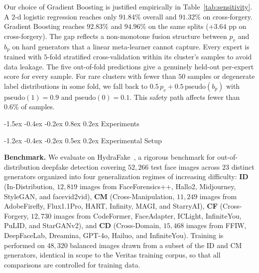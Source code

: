 \documentclass[10pt,twocolumn,letterpaper]{article}
\makeatletter
\renewcommand\section{\@startsection{section}{1}{\z@}%
  {-1.5ex \@plus -0.4ex \@minus -0.2ex}%
  {0.8ex \@plus 0.2ex}%
  {\normalfont\large\bfseries}}
\renewcommand\subsection{\@startsection{subsection}{2}{\z@}%
  {-1.2ex \@plus -0.4ex \@minus -0.2ex}%
  {0.5ex \@plus 0.2ex}%
  {\normalfont\normalsize\bfseries}}
\makeatother
\begin{document}
\par Our choice of Gradient Boosting is justified empirically in Table~\ref{tab:sensitivity}. A 2-d logistic regression reaches only $91.84\%$ overall and $91.32\%$ on cross-forgery. Gradient Boosting reaches $92.83\%$ and $94.96\%$ on the same splits ($+3.64$ pp on cross-forgery). The gap reflects a non-monotone fusion structure between $p_v$ and $b_p$ on hard generators that a linear meta-learner cannot capture. Every expert is trained with $5$-fold stratified cross-validation within its cluster's samples to avoid data leakage. The five out-of-fold predictions give a genuinely held-out per-expert score for every sample. For rare clusters with fewer than $50$ samples or degenerate label distributions in some fold, we fall back to $0.5\,p_v + 0.5\,\mathrm{pseudo}(b_p)$ with $\mathrm{pseudo}(1){=}0.9$ and $\mathrm{pseudo}(0){=}0.1$. This safety path affects fewer than $0.6\%$ of samples.

\section{Experiments}
\label{sec:experiments}

\subsection{Experimental Setup}
\label{sec:setup}

\textbf{Benchmark.}
We evaluate on HydraFake~\cite{veritas}, a rigorous benchmark for out-of-distribution deepfake detection covering $52{,}266$ test face images across $23$ distinct generators organized into four generalization regimes of increasing difficulty: \textbf{ID} (In-Distribution, $12{,}819$ images from FaceForensics++, Hallo2, Midjourney, StyleGAN, and facevid2vid), \textbf{CM} (Cross-Manipulation, $11{,}249$ images from AdobeFirefly, Flux1.1Pro, HART, Infinity, MAGI, and StarryAI), \textbf{CF} (Cross-Forgery, $12{,}730$ images from CodeFormer, FaceAdapter, ICLight, InfiniteYou, PuLID, and StarGANv2), and \textbf{CD} (Cross-Domain, $15{,}468$ images from FFIW, DeepFaceLab, Dreamina, GPT-4o, Hailuo, and InfiniteYou). Training is performed on $48{,}320$ balanced images drawn from a subset of the ID and CM generators, identical in scope to the Veritas training corpus, so that all comparisons are controlled for training data.
\end{document}
